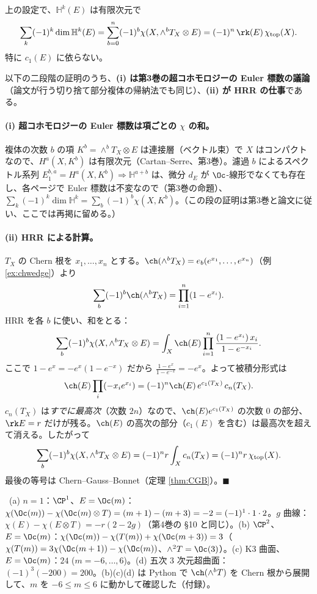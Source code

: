 \begin{thm}\label{thm:EulerTot}
上の設定で、$\mathbb H^k(E)$ は有限次元で
\[
\sum_k(-1)^k\dim\mathbb H^k(E)=\sum_{b=0}^n(-1)^b\chi(X,\wedge^bT_X\otimes E)=(-1)^n\,\rk(E)\,\chi_{\rm top}(X).
\]
特に $c_1(E)$ に依らない。
\end{thm}
\noindent 以下の二段階の証明のうち、\textbf{(i) は第3巻の超コホモロジーの Euler 標数の議論}（論文が行う切り捨て部分複体の帰納法でも同じ）、\textbf{(ii) が HRR の仕事}である。

\paragraph{(i) 超コホモロジーの Euler 標数は項ごとの $\chi$ の和。}複体の次数 $b$ の項 $K^b=\wedge^bT_X\otimes E$ は連接層（ベクトル束）で $X$ はコンパクトなので、$H^a(X,K^b)$ は有限次元（Cartan--Serre、第3巻）。濾過 $b$ によるスペクトル系列 $E_1^{b,a}=H^a(X,K^b)\Rightarrow\mathbb H^{a+b}$ は、微分 $d_E$ が $\Oc$-線形でなくても存在し、各ページで Euler 標数は不変なので（第3巻の命題）、$\sum_k(-1)^k\dim\mathbb H^k=\sum_b(-1)^b\chi(X,K^b)$。（この段の証明は第3巻と論文に従い、ここでは再掲に留める。）

\paragraph{(ii) HRR による計算。}$T_X$ の Chern 根を $x_1,\dots,x_n$ とする。$\ch(\wedge^bT_X)=e_b(e^{x_1},\dots,e^{x_n})$（例 \ref{ex:chwedge}）より
\[
\sum_b(-1)^b\ch(\wedge^bT_X)=\prod_{i=1}^n(1-e^{x_i}).
\]
HRR を各 $b$ に使い、和をとる：
\[
\sum_b(-1)^b\chi(X,\wedge^bT_X\otimes E)=\int_X\ch(E)\prod_{i=1}^n\frac{(1-e^{x_i})\,x_i}{1-e^{-x_i}}.
\]
ここで $1-e^{x}=-e^{x}(1-e^{-x})$ だから $\frac{1-e^x}{1-e^{-x}}=-e^x$。よって被積分形式は
\[
\ch(E)\prod_i(-x_ie^{x_i})=(-1)^n\ch(E)\,e^{c_1(T_X)}\,c_n(T_X).
\]
$c_n(T_X)$ は\emph{すでに最高次}（次数 $2n$）なので、$\ch(E)e^{c_1(T_X)}$ の次数 $0$ の部分、$\rk E=r$ だけが残る。$\ch(E)$ の高次の部分（$c_1(E)$ を含む）は最高次を超えて消える。したがって
\[
\sum_b(-1)^b\chi(X,\wedge^bT_X\otimes E)=(-1)^nr\int_Xc_n(T_X)=(-1)^nr\,\chi_{\rm top}(X).
\]
最後の等号は Chern--Gauss--Bonnet（定理 \ref{thm:CGB}）。\hfill$\blacksquare$
\begin{ex}[確認]\label{ex:EulerCheck}\tP\
(a) $n=1$：$\CP^1$、$E=\Oc(m)$：$\chi(\Oc(m))-\chi(\Oc(m)\otimes T)=(m+1)-(m+3)=-2=(-1)^1\cdot1\cdot2$。$g$ 曲線：$\chi(E)-\chi(E\otimes T)=-r(2-2g)$（第4巻の \S10 と同じ）。(b) $\CP^2$、$E=\Oc(m)$：$\chi(\Oc(m))-\chi(T(m))+\chi(\Oc(m+3))=3$（$\chi(T(m))=3\chi(\Oc(m+1))-\chi(\Oc(m))$、$\wedge^2T=\Oc(3)$）。(c) K3 曲面、$E=\Oc(m)$：$24$ ($m=-6,\dots,6$)。(d) 五次 3 次元超曲面：$(-1)^3(-200)=200$。(b)(c)(d) は Python で $\ch(\wedge^bT)$ を Chern 根から展開して、$m$ を $-6\le m\le6$ に動かして確認した（付録）。
\end{ex}

